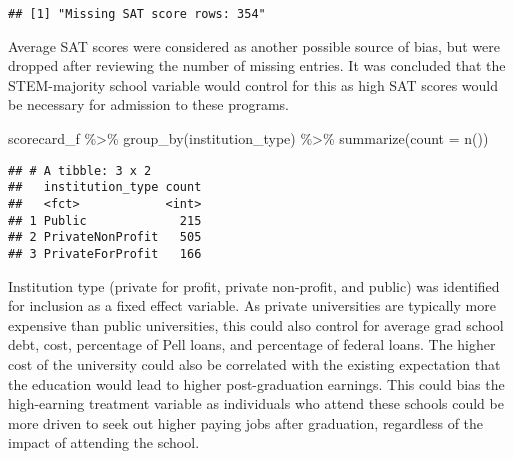 \documentclass[
]{article}
\newenvironment{Shaded}{\begin{snugshade}}{\end{snugshade}}
\newcommand{\AttributeTok}[1]{\textcolor[rgb]{0.77,0.63,0.00}{#1}}
\newcommand{\FunctionTok}[1]{\textcolor[rgb]{0.00,0.00,0.00}{#1}}
\newcommand{\NormalTok}[1]{#1}
\newcommand{\OtherTok}[1]{\textcolor[rgb]{0.56,0.35,0.01}{#1}}
\newcommand{\SpecialCharTok}[1]{\textcolor[rgb]{0.00,0.00,0.00}{#1}}
\newcommand{\StringTok}[1]{\textcolor[rgb]{0.31,0.60,0.02}{#1}}
\begin{document}
\begin{Shaded}
\end{Shaded}

\begin{verbatim}
## [1] "Missing SAT score rows: 354"
\end{verbatim}

Average SAT scores were considered as another possible source of bias,
but were dropped after reviewing the number of missing entries. It was
concluded that the STEM-majority school variable would control for this
as high SAT scores would be necessary for admission to these programs.

\begin{Shaded}
\begin{Highlighting}[]
\NormalTok{scorecard\_f }\SpecialCharTok{\%\textgreater{}\%} \FunctionTok{group\_by}\NormalTok{(institution\_type) }\SpecialCharTok{\%\textgreater{}\%} \FunctionTok{summarize}\NormalTok{(}\AttributeTok{count =} \FunctionTok{n}\NormalTok{())}
\end{Highlighting}
\end{Shaded}

\begin{verbatim}
## # A tibble: 3 x 2
##   institution_type count
##   <fct>            <int>
## 1 Public             215
## 2 PrivateNonProfit   505
## 3 PrivateForProfit   166
\end{verbatim}

Institution type (private for profit, private non-profit, and public)
was identified for inclusion as a fixed effect variable. As private
universities are typically more expensive than public universities, this
could also control for average grad school debt, cost, percentage of
Pell loans, and percentage of federal loans. The higher cost of the
university could also be correlated with the existing expectation that
the education would lead to higher post-graduation earnings. This could
bias the high-earning treatment variable as individuals who attend these
schools could be more driven to seek out higher paying jobs after
graduation, regardless of the impact of attending the school.
\end{document}
